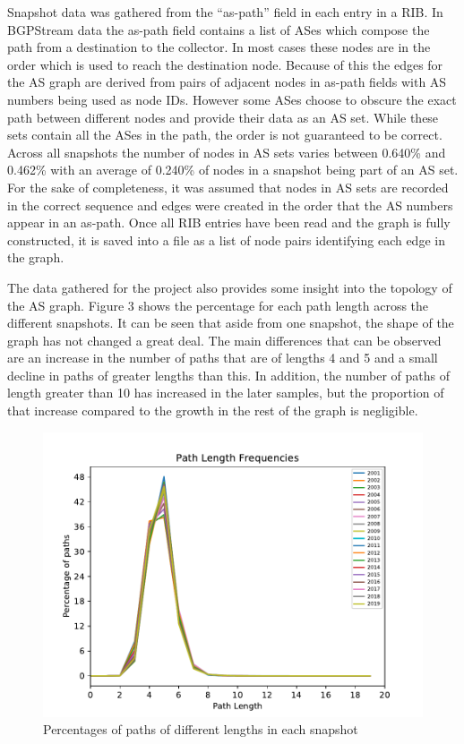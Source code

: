 \documentclass{mpaper}
\begin{document}
Snapshot data was gathered from the ``as-path'' field in each entry in a RIB. In BGPStream data the as-path field contains a list of ASes which compose the path from a destination to the collector. In most cases these nodes are in the order which is used to reach the destination node. Because of this the edges for the AS graph are derived from pairs of adjacent nodes in as-path fields with AS numbers being used as node IDs. However some ASes choose to obscure the exact path between different nodes and provide their data as an AS set. While these sets contain all the ASes in the path, the order is not guaranteed to be correct. Across all snapshots the number of nodes in AS sets varies between 0.640\% and 0.462\% with an average of 0.240\% of nodes in a snapshot being part of an AS set. For the sake of completeness, it was assumed that nodes in AS sets are recorded in the correct sequence and edges were created in the order that the AS numbers appear in an as-path. Once all RIB entries have been read and the graph is fully constructed, it is saved into a file as a list of node pairs identifying each edge in the graph.

The data gathered for the project also provides some insight into the topology of the AS graph. Figure 3 shows the percentage for each path length across the different snapshots. It can be seen that aside from one snapshot, the shape of the graph has not changed a great deal. The main differences that can be observed are an increase in the number of paths that are of lengths 4 and 5 and a small decline in paths of greater lengths than this. In addition, the number of paths of length greater than 10 has increased in the later samples, but the proportion of that increase compared to the growth in the rest of the graph is negligible. 

\begin{figure}
    \centering
    \includegraphics{dissertation/images/path-frequencies.pdf}
    \caption{Percentages of paths of different lengths in each snapshot}
    \captionsetup{justification=centering}
\end{figure}
\end{document}
